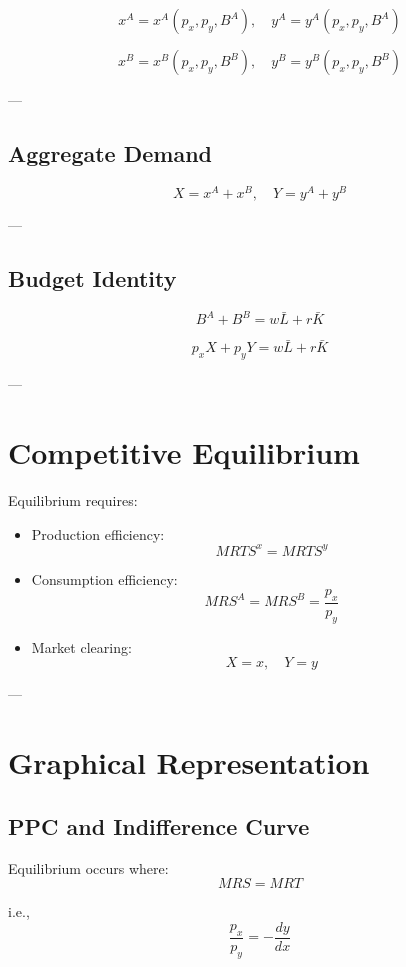 \[
x^A = x^A(p_x, p_y, B^A), \quad
y^A = y^A(p_x, p_y, B^A)
\]

\[
x^B = x^B(p_x, p_y, B^B), \quad
y^B = y^B(p_x, p_y, B^B)
\]

---

\subsection{Aggregate Demand}

\[
X = x^A + x^B, \quad Y = y^A + y^B
\]

---

\subsection{Budget Identity}

\[
B^A + B^B = w\bar{L} + r\bar{K}
\]

\[
p_x X + p_y Y = w\bar{L} + r\bar{K}
\]

---

\section{Competitive Equilibrium}

Equilibrium requires:

\begin{itemize}
    \item Production efficiency:
    \[
    MRTS^x = MRTS^y
    \]

    \item Consumption efficiency:
    \[
    MRS^A = MRS^B = \frac{p_x}{p_y}
    \]

    \item Market clearing:
    \[
    X = x, \quad Y = y
    \]
\end{itemize}

---

\section{Graphical Representation}

\subsection{PPC and Indifference Curve}

Equilibrium occurs where:
\[
MRS = MRT
\]

i.e.,
\[
\frac{p_x}{p_y} = -\frac{dy}{dx}
\]

